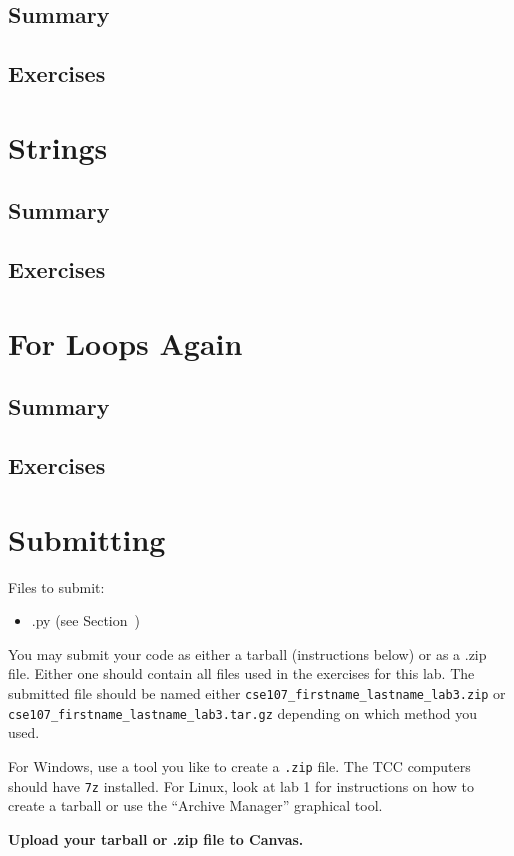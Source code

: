 \documentclass[11pt]{cselabheader}
\begin{document}

\subsection{Summary}

\subsection{Exercises}
\label{subsec:listsex}

\section{Strings}
\subsection{Summary}

\subsection{Exercises}
\label{subsec:stringsex}

\section{For Loops Again}
\subsection{Summary}

\subsection{Exercises}
\label{subsec:forex}


\pagebreak
\section{Submitting}

Files to submit:
\begin{itemize}
  \item .py (see Section~)
\end{itemize}

You may submit your code as either a tarball (instructions below) or as a .zip
file. Either one should contain all files used in the exercises for this lab.
The submitted file should be named either
\texttt{cse107\_firstname\_lastname\_lab3.zip} or
\texttt{cse107\_firstname\_lastname\_lab3.tar.gz} depending on which method you
used.

For Windows, use a tool you like to create a \texttt{.zip} file. The TCC computers should
have \texttt{7z} installed. For Linux, look at lab 1 for instructions on how to
create a tarball or use the ``Archive Manager'' graphical tool.

\begin{center}
  \textbf{Upload your tarball or .zip file to Canvas.}
\end{center}
\end{document}
